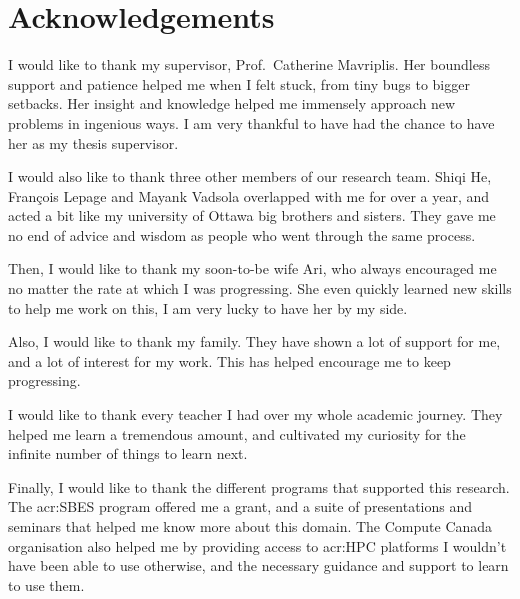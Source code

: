 \chapter*{Acknowledgements}

I would like to thank my supervisor, Prof.\ Catherine Mavriplis. Her boundless support and patience
helped me when I felt stuck, from tiny bugs to bigger setbacks. Her insight and knowledge helped me
immensely approach new problems in ingenious ways. I am very thankful to have had the chance to have
her as my thesis supervisor.

I would also like to thank three other members of our research team. Shiqi He, François Lepage and
Mayank Vadsola overlapped with me for over a year, and acted a bit like my university of Ottawa big
brothers and sisters. They gave me no end of advice and wisdom as people who went through the same
process.

Then, I would like to thank my soon-to-be wife Ari, who always encouraged me no matter the rate at
which I was progressing. She even quickly learned new skills to help me work on this, I am very
lucky to have her by my side.

Also, I would like to thank my family. They have shown a lot of support for me, and a lot of
interest for my work. This has helped encourage me to keep progressing.

I would like to thank every teacher I had over my whole academic journey. They helped me learn a
tremendous amount, and cultivated my curiosity for the infinite number of things to learn next.

Finally, I would like to thank the different programs that supported this research. The
\acrfull{acr:SBES} program offered me a grant, and a suite of presentations and seminars that helped
me know more about this domain. The Compute Canada organisation also helped me by providing access
to \acrshort{acr:HPC} platforms I wouldn't have been able to use otherwise, and the necessary
guidance and support to learn to use them.